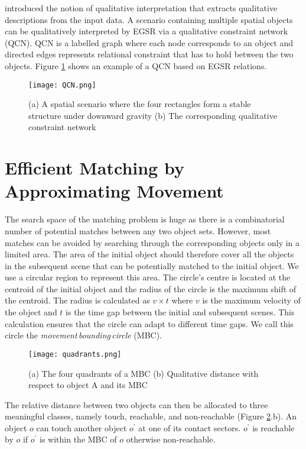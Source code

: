 \documentclass[letterpaper]{article}
\begin{document}
\cite{wallgrun2010qualitative} introduced the notion of qualitative interpretation that extracts qualitative descriptions from the input data. A scenario containing multiple spatial objects can be qualitatively interpreted by EGSR via a qualitative constraint network (QCN). QCN is a labelled graph where each node corresponds to an object and directed edges represents relational constraint that has to hold between the two objects. 
Figure \ref{QCN} shows an example of a QCN based on EGSR relations.


 \begin{figure}[h!]
\centering\texttt{[image: QCN.png]}\caption{(a) A spatial scenario where the four rectangles form a stable structure under downward gravity (b) The corresponding qualitative constraint network}
\label{QCN}
\end{figure}

\section{Efficient Matching by Approximating Movement}\label{approxM}

The search space of the matching problem is huge as there is a combinatorial number of potential matches between any two object sets. However, most matches can be avoided by searching through the corresponding objects only in a limited area. The area of the initial object should therefore cover all the objects in the subsequent scene that can be potentially matched to the initial object.  We use a circular region to represent this area. The circle's centre is located at the centroid of the initial object and the radius of the circle is the maximum shift of the centroid. The radius is calculated as $v \times t$ where $v$ is the maximum velocity of the object and $t$ is the time gap between the initial and subsequent scenes. This calculation ensures that the circle can adapt to different time gaps. We call this circle the \emph{movement\,bounding\,circle} (MBC).  
\begin{figure}[h!]
\centering\texttt{[image: quadrants.png]}\caption{(a) The four quadrants of a MBC (b) Qualitative distance with respect to object A and its MBC}
\label{Quadrants}
\end{figure}

The relative distance between two objects can then be allocated to three meaningful classes, namely touch, reachable, and non-reachable (Figure \ref{Quadrants}.b). An object $o$ can touch another object $o^\prime$ at one of its contact sectors. $o^\prime$ is reachable by $o$ if $o^\prime$ is within the MBC of $o$ otherwise non-reachable. 
\end{document}
